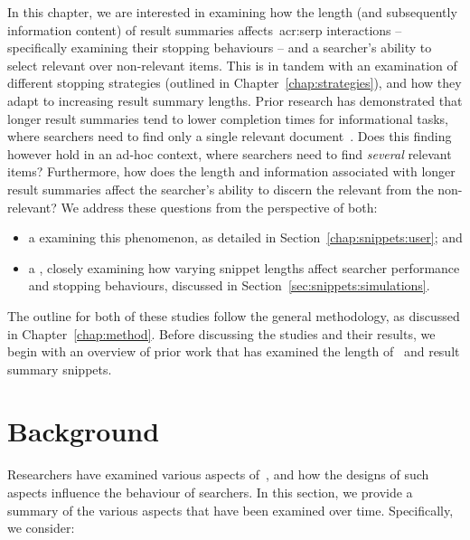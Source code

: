 

In this chapter, we are interested in examining how the length (and subsequently information content) of result summaries affects~\gls{acr:serp} interactions -- specifically examining their stopping behaviours -- and a searcher's ability to select relevant over non-relevant items. This is in tandem with an examination of different stopping strategies (outlined in Chapter~\ref{chap:strategies}), and how they adapt to increasing result summary lengths. Prior research has demonstrated that longer result summaries tend to lower completion times for informational tasks, where searchers need to find only a single relevant document~\citep{cutrell2007eye_tracking}. Does this finding however hold in an ad-hoc context, where searchers need to find \emph{several} relevant items? Furthermore, how does the length and information associated with longer result summaries affect the searcher's ability to discern the relevant from the non-relevant? We address these questions from the perspective of both:

\begin{itemize}
    \item{a  examining this phenomenon, as detailed in Section~\ref{chap:snippets:user}; and}
    \item{a , closely examining how varying snippet lengths affect searcher performance and stopping behaviours, discussed in Section~\ref{sec:snippets:simulations}.}
\end{itemize}

The outline for both of these studies follow the general methodology, as discussed in Chapter~\ref{chap:method}. Before discussing the studies and their results, we begin with an overview of prior work that has examined the length of~ and result summary snippets.

\section{Background}\label{chap:snippets:background}
Researchers have examined various aspects of~, and how the designs of such aspects influence the behaviour of searchers. In this section, we provide a summary of the various aspects that have been examined over time. Specifically, we consider:

